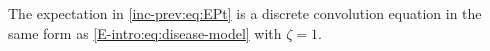 \documentclass[thesis.tex]{subfiles}
\begin{document}



The expectation in \cref{inc-prev:eq:EPt} is a discrete convolution equation in the same form as \cref{E-intro:eq:disease-model} with $\zeta = 1$.
\end{document}
